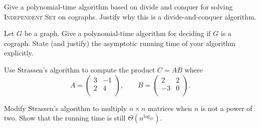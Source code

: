 
\question Give a polynomial-time algorithm based on divide and conquer for solving \textsc{Independent Set} on cographs. 
Justify why this is a divide-and-conquer algorithm.

\question Let $G$ be a graph. Give a polynomial-time algorithm for deciding if $G$ is a cograph.
State (and justify) the asymptotic running time of your algorithm explicitly.

\question Use Strassen's algorithm to compute the product $C = AB$ where
\[
    A = 
    \begin{pmatrix}
        3 & -1 \\
        2 & 4  \\
    \end{pmatrix},
    \qquad
    B =
    \begin{pmatrix}
        2  & 2 \\
        -3 & 0 \\
    \end{pmatrix}
    .
\]

\question Modify Strassen's algorithm to multiply $n \times n$ matrices when $n$ is not a power of two.
Show that the running time is still $\Theta(n^{\log_27})$.
